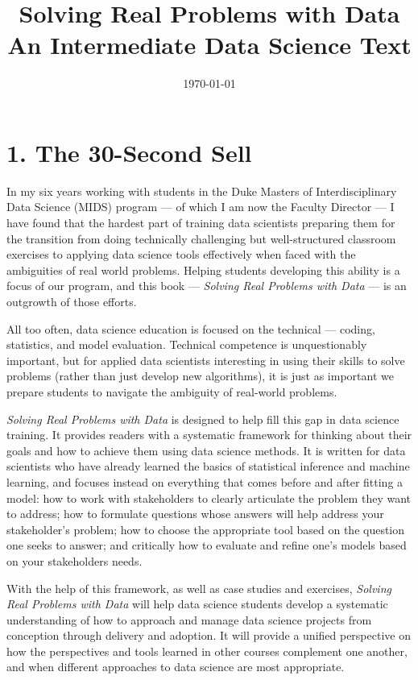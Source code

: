 \documentclass[12pt]{article}
\title{Solving Real Problems with Data \\ An Intermediate Data Science Text}
\begin{document}
\setlength{\parindent}{0.0in}
\setlength{\parskip}{.125in}


\date{\today }


\maketitle

\section*{1. The 30-Second Sell}\label{the-30-second-sell}

In my six years working with students in the Duke Masters of
Interdisciplinary Data Science (MIDS) program --- of which I am now the
Faculty Director --- I have found that the hardest part of training data
scientists preparing them for the transition from doing technically
challenging but well-structured classroom exercises to applying data
science tools effectively when faced with the ambiguities of real world
problems. Helping students developing this ability is a focus of our
program, and this book --- \emph{Solving Real Problems with Data} --- is
an outgrowth of those efforts.

All too often, data science education is focused on the technical ---
coding, statistics, and model evaluation. Technical competence is
unquestionably important, but for applied data scientists interesting in
using their skills to solve problems (rather than just develop new
algorithms), it is just as important we prepare students to navigate the
ambiguity of real-world problems.

\emph{Solving Real Problems with Data} is designed to help fill this gap
in data science training. It provides readers with a systematic
framework for thinking about their goals and how to achieve them using
data science methods. It is written for data scientists who have already
learned the basics of statistical inference and machine learning, and
focuses instead on everything that comes before and after fitting a
model: how to work with stakeholders to clearly articulate the problem
they want to address; how to formulate questions whose answers will help
address your stakeholder's problem; how to choose the appropriate tool
based on the question one seeks to answer; and critically how to
evaluate and refine one's models based on your stakeholders needs.

With the help of this framework, as well as case studies and exercises,
\emph{Solving Real Problems with Data} will help data science students
develop a systematic understanding of how to approach and manage data
science projects from conception through delivery and adoption. It will
provide a unified perspective on how the perspectives and tools learned
in other courses complement one another, and when different approaches
to data science are most appropriate.
\end{document}
